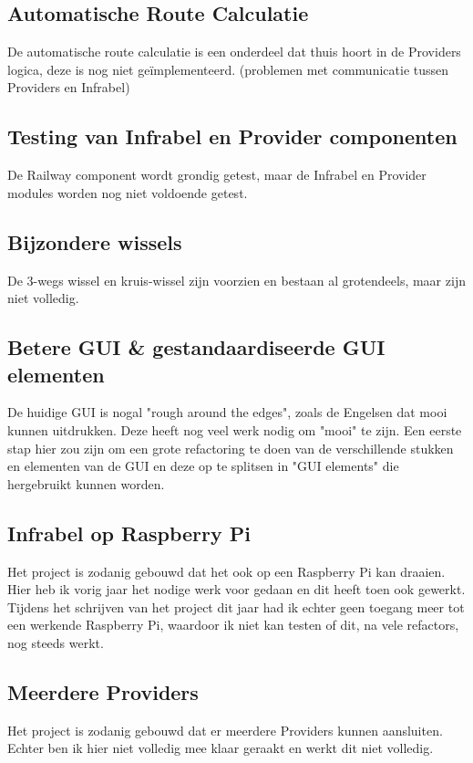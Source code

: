 \documentclass[a4paper, 11pt]{article}
\newcommand{\<}{\scriptsize\textless\normalsize}
\renewcommand{\>}{\scriptsize\textgreater\normalsize}
\begin{document}
\subsection{Automatische Route Calculatie}
De automatische route calculatie is een onderdeel dat thuis hoort in de Providers logica, deze is nog niet ge\"implementeerd. (problemen met communicatie tussen Providers en Infrabel)
\subsection{Testing van Infrabel en Provider componenten}
De Railway component wordt grondig getest, maar de Infrabel en Provider modules worden nog niet voldoende getest.
\subsection{Bijzondere wissels}
De 3-wegs wissel en kruis-wissel zijn voorzien en bestaan al grotendeels, maar zijn niet volledig.
\subsection{Betere GUI \& gestandaardiseerde GUI elementen}
De huidige GUI is nogal "rough around the edges", zoals de Engelsen dat mooi kunnen uitdrukken. Deze heeft nog veel werk nodig om "mooi" te zijn. Een eerste stap hier zou zijn om een grote refactoring te doen van de verschillende stukken en elementen van de GUI en deze op te splitsen in "GUI elements" die hergebruikt kunnen worden.
\subsection{Infrabel op Raspberry Pi}
Het project is zodanig gebouwd dat het ook op een Raspberry Pi kan draaien. Hier heb ik vorig jaar het nodige werk voor gedaan en dit heeft toen ook gewerkt. Tijdens het schrijven van het project dit jaar had ik echter geen toegang meer tot een werkende Raspberry Pi, waardoor ik niet kan testen of dit, na vele refactors, nog steeds werkt.\\
\subsection{Meerdere Providers}
Het project is zodanig gebouwd dat er meerdere Providers kunnen aansluiten. Echter ben ik hier niet volledig mee klaar geraakt en werkt dit niet volledig.

\label{lastpage}
\end{document}
